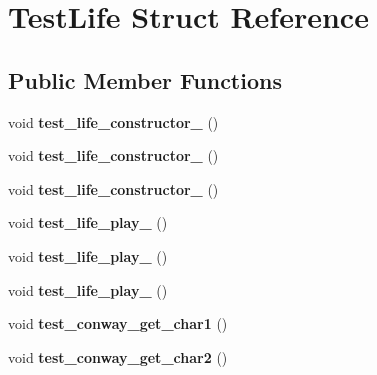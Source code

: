 \hypertarget{structTestLife}{\section{\-Test\-Life \-Struct \-Reference}
\label{structTestLife}
}
\subsection*{\-Public \-Member \-Functions}
\begin{DoxyCompactItemize}
\item 
\hypertarget{structTestLife_aa81b72ba616b8ffea7023124ddb86e67}{void {\bfseries test\-\_\-life\-\_\-constructor\-\_} ()}\label{structTestLife_aa81b72ba616b8ffea7023124ddb86e67}

\item 
\hypertarget{structTestLife_a726b38e224e18cffc9c1dda197e6bf30}{void {\bfseries test\-\_\-life\-\_\-constructor\-\_} ()}\label{structTestLife_a726b38e224e18cffc9c1dda197e6bf30}

\item 
\hypertarget{structTestLife_ad4683ecae1cc521ff46c84c30e830caa}{void {\bfseries test\-\_\-life\-\_\-constructor\-\_} ()}\label{structTestLife_ad4683ecae1cc521ff46c84c30e830caa}

\item 
\hypertarget{structTestLife_a8b48638d9ceb2ccae6c9105a1e859afb}{void {\bfseries test\-\_\-life\-\_\-play\-\_} ()}\label{structTestLife_a8b48638d9ceb2ccae6c9105a1e859afb}

\item 
\hypertarget{structTestLife_a38ffb7ff594784a545f79d6da3c9bb09}{void {\bfseries test\-\_\-life\-\_\-play\-\_} ()}\label{structTestLife_a38ffb7ff594784a545f79d6da3c9bb09}

\item 
\hypertarget{structTestLife_a3e2da8addb1d33fe5f476d91702cc9a4}{void {\bfseries test\-\_\-life\-\_\-play\-\_} ()}\label{structTestLife_a3e2da8addb1d33fe5f476d91702cc9a4}

\item 
\hypertarget{structTestLife_a7960f3dea9f333ade7b0fd19a09430bd}{void {\bfseries test\-\_\-conway\-\_\-get\-\_\-char1} ()}\label{structTestLife_a7960f3dea9f333ade7b0fd19a09430bd}

\item 
\hypertarget{structTestLife_af4e9d4886078f1a88cc77ccc3156a764}{void {\bfseries test\-\_\-conway\-\_\-get\-\_\-char2} ()}\label{structTestLife_af4e9d4886078f1a88cc77ccc3156a764}


\end{DoxyCompactItemize}
